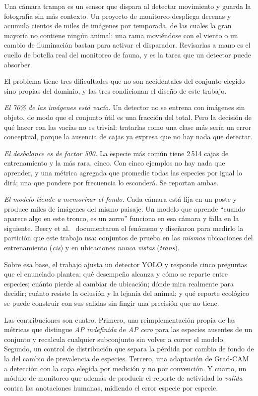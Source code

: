 Una cámara trampa es un sensor que dispara al detectar movimiento y guarda la
fotografía sin más contexto. Un proyecto de monitoreo despliega decenas y
acumula cientos de miles de imágenes por temporada, de las cuales la gran
mayoría no contiene ningún animal: una rama moviéndose con el viento o un cambio
de iluminación bastan para activar el disparador. Revisarlas a mano es el cuello
de botella real del monitoreo de fauna, y es la tarea que un detector puede
absorber.

El problema tiene tres dificultades que no son accidentales del conjunto elegido
sino propias del dominio, y las tres condicionan el diseño de este trabajo.

\emph{El 70\% de las imágenes está vacío.} Un detector no se entrena con
imágenes sin objeto, de modo que el conjunto útil es una fracción del total. Pero
la decisión de qué hacer con las vacías no es trivial: tratarlas como una clase
más sería un error conceptual, porque la ausencia de cajas ya expresa que no hay
nada que detectar.

\emph{El desbalance es de factor 500.} La especie más común tiene 2\,514 cajas
de entrenamiento y la más rara, cinco. Con cinco ejemplos no hay nada que
aprender, y una métrica agregada que promedie todas las especies por igual lo
dirá; una que pondere por frecuencia lo esconderá. Se reportan ambas.

\emph{El modelo tiende a memorizar el fondo.} Cada cámara está fija en un
poste y produce miles de imágenes del mismo paisaje. Un modelo que aprende
``cuando aparece algo en este tronco, es un zorro'' funciona en esa cámara y
falla en la siguiente. Beery et al.~\cite{beery2018recognition} documentaron el
fenómeno y diseñaron para medirlo la partición que este trabajo usa: conjuntos
de prueba en las \emph{mismas} ubicaciones del entrenamiento (\emph{cis}) y en
ubicaciones \emph{nunca vistas} (\emph{trans}).

Sobre esa base, el trabajo ajusta un detector YOLO y responde cinco preguntas
que el enunciado plantea: qué desempeño alcanza y cómo se reparte entre especies;
cuánto pierde al cambiar de ubicación; dónde mira realmente para decidir; cuánto
resiste la oclusión y la lejanía del animal; y qué reporte ecológico se puede
construir con sus salidas sin fingir una precisión que no tiene.

Las contribuciones son cuatro. Primero, una reimplementación propia de las
métricas que distingue
\emph{AP indefinida} de \emph{AP cero} para las especies ausentes de un conjunto
y recalcula cualquier subconjunto sin volver a correr el modelo. Segundo, un
control de distribución que separa la pérdida por cambio de fondo de la del
cambio de prevalencia de especies. Tercero, una adaptación de Grad-CAM a
detección con la capa elegida por medición y no por convención. Y cuarto, un
módulo de monitoreo que además de producir el reporte de actividad lo
\emph{valida} contra las anotaciones humanas, midiendo el error especie por
especie.
